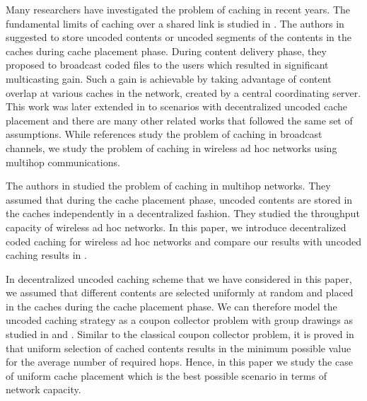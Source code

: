 \documentclass[10pt,journal]{IEEEtran}
\begin{document}
Many researchers have investigated the problem of caching in recent years. The fundamental limits of caching over a shared link is studied in \cite{DBLP:journals/tit/Maddah-AliN14}. The authors in \cite{DBLP:journals/tit/Maddah-AliN14} suggested to store uncoded contents or
uncoded segments of the contents in the caches during cache placement phase. During content delivery phase, they proposed to broadcast coded files to the users which resulted in  significant  multicasting gain. Such a gain is achievable by taking advantage of content overlap at  various caches in the network, created by a central coordinating server. This work was later extended in  \cite{DBLP:journals/ton/Maddah-AliN15} to scenarios with decentralized uncoded cache placement and there are many other related works that followed the same set of assumptions. %
While references  \cite{DBLP:journals/tit/Maddah-AliN14,DBLP:journals/ton/Maddah-AliN15} study the problem of caching in broadcast channels,  we  study the problem of caching in wireless ad hoc networks using multihop communications.

The authors in \cite{DBLP:conf/icc/JeonHJC15} studied the problem of caching in multihop networks. They assumed that during the cache placement phase, uncoded contents are stored in the caches independently in a decentralized fashion. They studied the throughput capacity of wireless ad hoc networks. In this paper, we  introduce decentralized coded caching for wireless ad hoc networks and compare our results with uncoded caching results in \cite{DBLP:conf/icc/JeonHJC15}. 

In decentralized uncoded caching scheme that we have considered in this paper, we assumed that different contents are selected uniformly at random and placed in the caches during the cache placement phase. We can therefore model the uncoded caching strategy as a coupon collector problem with group drawings as studied in \cite{stadje1990collector} and \cite{johnson1977urn}. Similar to the classical coupon collector problem, it is proved in \cite{johnson1977urn} that uniform selection of cached contents results in the minimum possible value for the average number of required hops. Hence, in this paper we study the case of uniform cache placement which is the best possible scenario in terms of network capacity.
\end{document}
